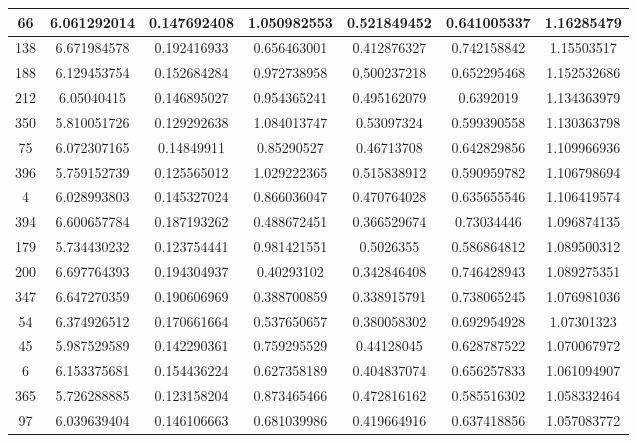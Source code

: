 \documentclass[UTF8]{ctexart}
\begin{document}
\begin{center}
\begin{longtable}{|c|c|c|c|c|c|c|}
		66     & 6.061292014 & 0.147692408 & 1.050982553 & 0.521849452 & 0.641005337     & 1.16285479  \\ \hline
		138    & 6.671984578 & 0.192416933 & 0.656463001 & 0.412876327 & 0.742158842     & 1.15503517  \\ \hline
		188    & 6.129453754 & 0.152684284 & 0.972738958 & 0.500237218 & 0.652295468     & 1.152532686 \\ \hline
		212    & 6.05040415  & 0.146895027 & 0.954365241 & 0.495162079 & 0.6392019       & 1.134363979 \\ \hline
		350    & 5.810051726 & 0.129292638 & 1.084013747 & 0.53097324  & 0.599390558     & 1.130363798 \\ \hline
		75     & 6.072307165 & 0.14849911  & 0.85290527  & 0.46713708  & 0.642829856     & 1.109966936 \\ \hline
		396    & 5.759152739 & 0.125565012 & 1.029222365 & 0.515838912 & 0.590959782     & 1.106798694 \\ \hline
		4      & 6.028993803 & 0.145327024 & 0.866036047 & 0.470764028 & 0.635655546     & 1.106419574 \\ \hline
		394    & 6.600657784 & 0.187193262 & 0.488672451 & 0.366529674 & 0.73034446      & 1.096874135 \\ \hline
		179    & 5.734430232 & 0.123754441 & 0.981421551 & 0.5026355   & 0.586864812     & 1.089500312 \\ \hline
		200    & 6.697764393 & 0.194304937 & 0.40293102  & 0.342846408 & 0.746428943     & 1.089275351 \\ \hline
		347    & 6.647270359 & 0.190606969 & 0.388700859 & 0.338915791 & 0.738065245     & 1.076981036 \\ \hline
		54     & 6.374926512 & 0.170661664 & 0.537650657 & 0.380058302 & 0.692954928     & 1.07301323  \\ \hline
		45     & 5.987529589 & 0.142290361 & 0.759295529 & 0.44128045  & 0.628787522     & 1.070067972 \\ \hline
		6      & 6.153375681 & 0.154436224 & 0.627358189 & 0.404837074 & 0.656257833     & 1.061094907 \\ \hline
		365    & 5.726288885 & 0.123158204 & 0.873465466 & 0.472816162 & 0.585516302     & 1.058332464 \\ \hline
		97     & 6.039639404 & 0.146106663 & 0.681039986 & 0.419664916 & 0.637418856     & 1.057083772 \\ \hline
	\end{longtable}
\end{center}
\end{document}
